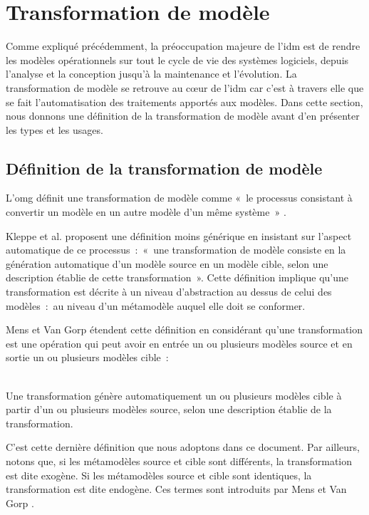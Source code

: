 \section{Transformation de modèle}
\label{sec:transfo_idm}
Comme expliqué précédemment, la préoccupation majeure de l'\gls{idm} est de 
rendre les modèles opérationnels sur tout le cycle de vie des systèmes 
logiciels, depuis l'analyse et la conception jusqu'à la maintenance et 
l'évolution. La transformation de modèle se retrouve au cœur de l'\gls{idm} car 
c'est à travers elle que se fait l'automatisation des traitements apportés aux 
modèles. Dans cette section, nous donnons une définition de la 
transformation de modèle avant d'en présenter les types et les usages.

\subsection{Définition de la transformation de modèle}
L'\gls{omg} définit une transformation de modèle comme «~le processus consistant à 
convertir un modèle en un autre modèle d'un même système~» \cite{omg2011meta}. 

Kleppe et al. \cite{kleppe2003mda} proposent une définition moins générique en insistant sur l'aspect automatique de ce processus~:~«~une transformation de modèle 
consiste en la génération automatique d'un modèle source en un modèle cible, 
selon une description établie de cette transformation~». Cette définition 
implique qu'une transformation est décrite à un niveau 
d'abstraction au dessus de celui des modèles~:~au niveau d'un métamodèle auquel elle doit se conformer. 

Mens et Van Gorp \cite{mens2006taxonomy} étendent cette définition en considérant qu'une 
transformation est une opération qui peut avoir en entrée un ou plusieurs 
modèles source et en sortie un ou plusieurs modèles cible~: 
\\\

\begin{definition}
Une transformation génère automatiquement un ou plusieurs modèles cible à partir 
d'un ou plusieurs modèles source, selon une description établie de la 
transformation. 
\end{definition}

C'est cette dernière définition que nous adoptons dans ce document. Par 
ailleurs, notons que, si les métamodèles source et cible sont différents, la 
transformation est dite exogène. Si les métamodèles source et cible 
sont identiques, la transformation est dite endogène. Ces 
termes sont introduits par Mens et Van Gorp \cite{mens2006taxonomy}.

